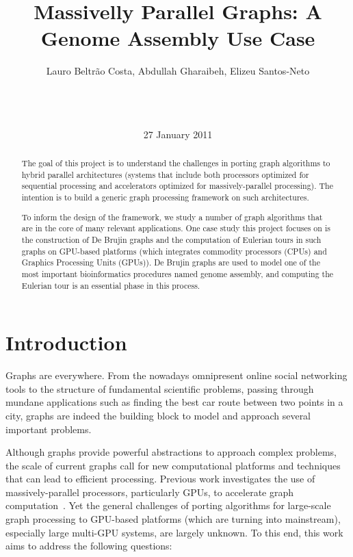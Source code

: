 \documentclass{acm_proc_article-sp}[12pt]
\title{Massivelly Parallel Graphs: A Genome Assembly Use Case}
\author{
\alignauthor 
Lauro Beltr\~ao Costa, Abdullah Gharaibeh, Elizeu
Santos-Neto\vspace{3mm}\\
       \affaddr{\small{University of British Columbia}}\\
       \affaddr{\small{2332 Main Mall}}\\
       \affaddr{\small{Vancouver, BC, CANADA}}\\
       \email{\small{\{lauroc,abdullah,elizeus\}@ece.ubc.ca}}
}
\date{27 January 2011}
\begin{document}
\maketitle
\begin{abstract}
The goal of this project is to understand the challenges in porting
graph algorithms to hybrid parallel architectures (systems that
include both processors optimized for sequential processing and
accelerators optimized for massively-parallel processing). The
intention is to build a generic graph processing framework on such
architectures. 

To inform the design of the framework, we study a number of graph
algorithms that are in the core of many relevant applications. One
case study this project focuses on is the construction of De Brujin
graphs and the computation of Eulerian tours in such graphs on
GPU-based platforms (which integrates commodity processors (CPUs) and
Graphics Processing Units (GPUs)). De Brujin graphs are used to model
one of the most important bioinformatics procedures named genome
assembly, and computing the Eulerian tour is an essential phase in
this process.
\end{abstract}


\section{Introduction}

Graphs are everywhere. From the nowadays omnipresent online social
networking tools to the structure of fundamental scientific problems,
passing through mundane applications such as finding the best car
route between two points in a city, graphs are indeed the building
block to model and approach several important problems.

Although graphs provide powerful abstractions to approach complex
problems, the scale of current graphs call for new computational
platforms and techniques that can lead to efficient processing.
Previous work investigates the use of massively-parallel
processors, particularly GPUs, to accelerate graph
computation~\cite{Harish2007, Katz2008, Malewicz2009, Sungpack2010,
  dehne2010exploring}. Yet the general challenges of porting
algorithms for large-scale graph processing to GPU-based platforms
(which are turning into mainstream), especially large multi-GPU
systems, are largely unknown. To this end, this work aims to address
the following questions:
\end{document}
